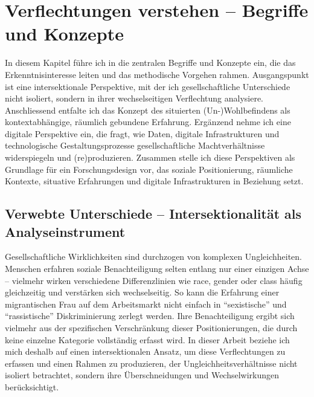 
\chapter{Verflechtungen verstehen -- Begriffe und Konzepte} \label{sec:theoretischer_rahmen}

In diesem Kapitel führe ich in die zentralen Begriffe und Konzepte ein, die das Erkenntnisinteresse leiten und das methodische Vorgehen rahmen. Ausgangspunkt ist eine intersektionale Perspektive, mit der ich gesellschaftliche Unterschiede nicht isoliert, sondern in ihrer wechselseitigen Verflechtung analysiere. Anschliessend entfalte ich das Konzept des situierten (Un-)Wohlbefindens als kontextabhängige, räumlich gebundene Erfahrung. Ergänzend nehme ich eine digitale Perspektive ein, die fragt, wie Daten, digitale Infrastrukturen und technologische Gestaltungsprozesse gesellschaftliche Machtverhältnisse widerspiegeln und (re)produzieren. Zusammen stelle ich diese Perspektiven als Grundlage für ein Forschungsdesign vor, das soziale Positionierung, räumliche Kontexte, situative Erfahrungen und digitale Infrastrukturen in Beziehung setzt.

\section{Verwebte Unterschiede -- Intersektionalität als Analyseinstrument}

Gesellschaftliche Wirklichkeiten sind durchzogen von komplexen Ungleichheiten. Menschen erfahren soziale Benachteiligung selten entlang nur einer einzigen Achse -- vielmehr wirken verschiedene Differenzlinien wie \gls{race}, \gls{gender} oder \gls{class} häufig gleichzeitig und verstärken sich wechselseitig. So kann die Erfahrung einer migrantischen Frau auf dem Arbeitsmarkt nicht einfach in \enquote{sexistische} und \enquote{rassistische} Diskriminierung zerlegt werden. Ihre Benachteiligung ergibt sich vielmehr aus der spezifischen Verschränkung dieser Positionierungen, die durch keine einzelne Kategorie vollständig erfasst wird. In dieser Arbeit beziehe ich mich deshalb auf einen intersektionalen Ansatz, um diese Verflechtungen zu erfassen und einen Rahmen zu produzieren, der Ungleichheitsverhältnisse nicht isoliert betrachtet, sondern ihre Überschneidungen und Wechselwirkungen berücksichtigt.


